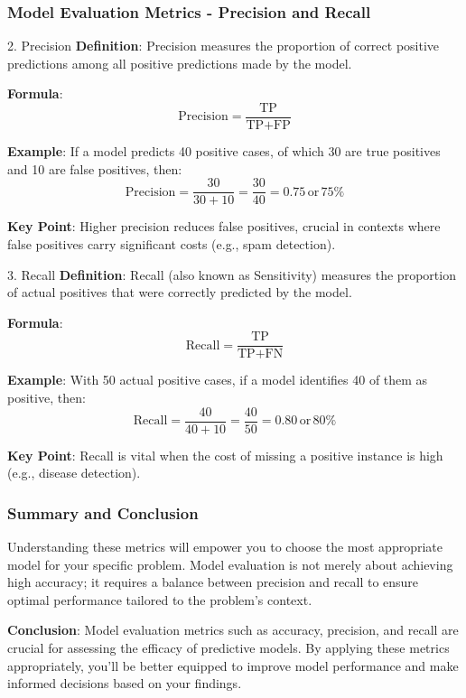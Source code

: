 \documentclass[aspectratio=169]{beamer}
\begin{document}
\begin{frame}[fragile]
  \frametitle{Model Evaluation Metrics - Precision and Recall}
  \begin{block}{2. Precision}
    \textbf{Definition}: Precision measures the proportion of correct positive predictions among all positive predictions made by the model.
    
    \textbf{Formula}:  
    \begin{equation}
    \text{Precision} = \frac{\text{TP}}{\text{TP} + \text{FP}}
    \end{equation}

    \textbf{Example}: 
    If a model predicts 40 positive cases, of which 30 are true positives and 10 are false positives, then:
    \begin{equation}
    \text{Precision} = \frac{30}{30 + 10} = \frac{30}{40} = 0.75 \, \text{or} \, 75\%
    \end{equation}

    \textbf{Key Point}: Higher precision reduces false positives, crucial in contexts where false positives carry significant costs (e.g., spam detection).
  \end{block}

  \begin{block}{3. Recall}
    \textbf{Definition}: Recall (also known as Sensitivity) measures the proportion of actual positives that were correctly predicted by the model.

    \textbf{Formula}:  
    \begin{equation}
    \text{Recall} = \frac{\text{TP}}{\text{TP} + \text{FN}}
    \end{equation}

    \textbf{Example}: 
    With 50 actual positive cases, if a model identifies 40 of them as positive, then:
    \begin{equation}
    \text{Recall} = \frac{40}{40 + 10} = \frac{40}{50} = 0.80 \, \text{or} \, 80\%
    \end{equation}

    \textbf{Key Point}: Recall is vital when the cost of missing a positive instance is high (e.g., disease detection).
  \end{block}
\end{frame}

\begin{frame}[fragile]
  \frametitle{Summary and Conclusion}
  Understanding these metrics will empower you to choose the most appropriate model for your specific problem.
  Model evaluation is not merely about achieving high accuracy; it requires a balance between precision and recall to ensure optimal performance tailored to the problem's context.
  
  \textbf{Conclusion}: Model evaluation metrics such as accuracy, precision, and recall are crucial for assessing the efficacy of predictive models. By applying these metrics appropriately, you'll be better equipped to improve model performance and make informed decisions based on your findings.
\end{frame}
\end{document}
